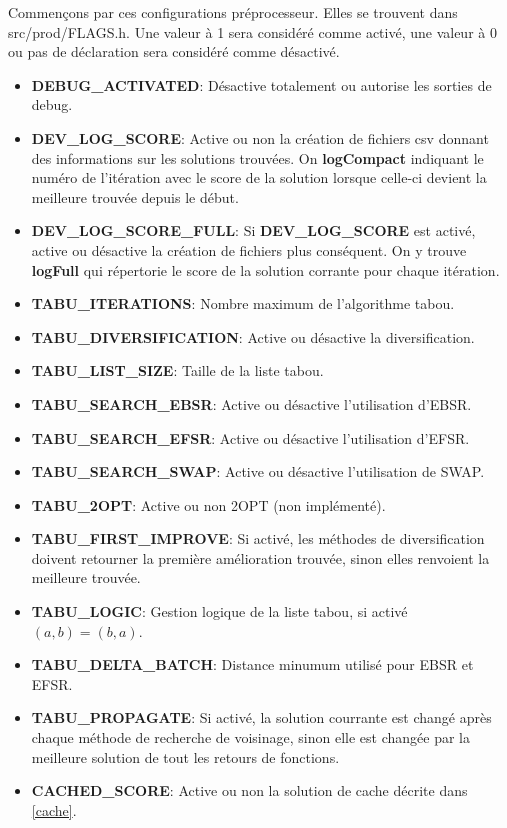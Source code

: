 \documentclass[hideweeklyreports]{polytech/polytech}
\begin{document}
			Commençons par ces configurations préprocesseur. Elles se trouvent dans src/prod/FLAGS.h. Une valeur à 1 sera considéré comme activé, une valeur à 0 ou pas de déclaration sera considéré comme désactivé.
			\begin{itemize}
				\item \textbf{DEBUG\_ACTIVATED}: Désactive totalement ou autorise les sorties de debug.
				\item \textbf{DEV\_LOG\_SCORE}: Active ou non la création de fichiers csv donnant des informations sur les solutions trouvées. On \textbf{logCompact} indiquant le numéro de l'itération avec le score de la solution lorsque celle-ci devient la meilleure trouvée depuis le début.
				\item \textbf{DEV\_LOG\_SCORE\_FULL}: Si \textbf{DEV\_LOG\_SCORE} est activé, active ou désactive la création de fichiers plus conséquent. On y trouve \textbf{logFull} qui répertorie le score de la solution corrante pour chaque itération.
				\item \textbf{TABU\_ITERATIONS}: Nombre maximum de l'algorithme tabou.
				\item \textbf{TABU\_DIVERSIFICATION}: Active ou désactive la diversification.
				\item \textbf{TABU\_LIST\_SIZE}: Taille de la liste tabou.
				\item \textbf{TABU\_SEARCH\_EBSR}: Active ou désactive l'utilisation d'EBSR.
				\item \textbf{TABU\_SEARCH\_EFSR}: Active ou désactive l'utilisation d'EFSR.
				\item \textbf{TABU\_SEARCH\_SWAP}: Active ou désactive l'utilisation de SWAP.
				\item \textbf{TABU\_2OPT}: Active ou non 2OPT (non implémenté).
				\item \textbf{TABU\_FIRST\_IMPROVE}: Si activé, les méthodes de diversification doivent retourner la première amélioration trouvée, sinon elles renvoient la meilleure trouvée.
				\item \textbf{TABU\_LOGIC}: Gestion logique de la liste tabou, si activé $\left( a,b\right)=\left( b,a\right)$.
				\item \textbf{TABU\_DELTA\_BATCH}: Distance minumum utilisé pour EBSR et EFSR.
				\item \textbf{TABU\_PROPAGATE}: Si activé, la solution courrante est changé après chaque méthode de recherche de voisinage, sinon elle est changée par la meilleure solution de tout les retours de fonctions.
				\item \textbf{CACHED\_SCORE}: Active ou non la solution de cache décrite dans \autoref{cache}.

\end{itemize}
\end{document}
